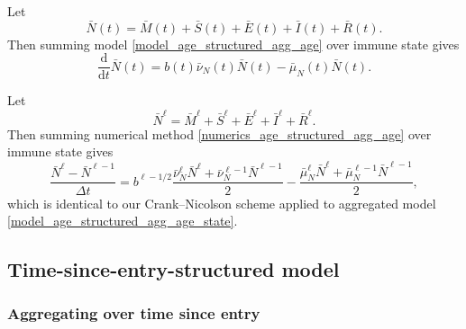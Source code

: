 \documentclass[USenglish]{article}
\newcommand{\md}{\mathrm{d}}
\begin{document}
Let
\begin{equation}
  \bar{N}(t)
  = \bar{M}(t) + \bar{S}(t) + \bar{E}(t) + \bar{I}(t) + \bar{R}(t).
\end{equation}
Then summing model \eqref{model_age_structured_agg_age} over immune
state gives
\begin{equation}
  \label{model_age_structured_agg_age_state}
  \frac{\md}{\md t} \bar{N}(t)
  = b(t) \bar{\nu}_N(t) \bar{N}(t)
  - \bar{\mu}_N(t) \bar{N}(t).
\end{equation}


Let
\begin{equation}
  \bar{N}^{\ell}
  = \bar{M}^{\ell} + \bar{S}^{\ell} + \bar{E}^{\ell}
 + \bar{I}^{\ell} + \bar{R}^{\ell}.
\end{equation}
Then summing numerical method
\eqref{numerics_age_structured_agg_age} over immune state gives
\begin{equation}
  \label{numerics_age_structured_agg_age_state}
  \frac{\bar{N}^{\ell} - \bar{N}^{\ell - 1}}{\Delta t}
  = b^{\ell - 1 / 2}
  \frac{\bar{\nu}_N^{\ell} \bar{N}^{\ell}
  + \bar{\nu}_N^{\ell - 1} \bar{N}^{\ell - 1}}{2}
  - \frac{\bar{\mu}_N^{\ell} \bar{N}^{\ell}
  + \bar{\mu}_N^{\ell - 1} \bar{N}^{\ell - 1}}{2},
\end{equation}
which is identical to our Crank--Nicolson scheme applied to aggregated
model \eqref{model_age_structured_agg_age_state}.


\subsection{Time-since-entry-structured model}


\subsubsection{Aggregating over time since entry}
\end{document}
